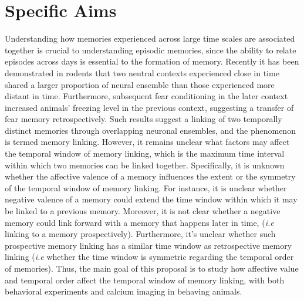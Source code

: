 \documentclass[master.tex]{subfiles}
\begin{document}
\section*{Specific Aims}

Understanding how memories experienced across large time scales are associated
together is crucial to understanding episodic memories, since the ability to
relate episodes across days is essential to the formation of memory. Recently it
has been demonstrated in rodents that two neutral contexts experienced close in
time shared a larger proportion of neural ensemble than those experienced more
distant in time. Furthermore, subsequent fear conditioning in the later context
increased animals' freezing level in the previous context, suggesting a transfer
of fear memory retrospectively. Such results suggest a
linking of two temporally distinct memories through overlapping neuronal
ensembles, and the phenomenon is termed memory linking. However, it remains
unclear what factors may affect the temporal window of memory linking, which is
the maximum time interval within which two memories can be linked together.
Specifically, it is unknown whether the affective valence of a memory influences
the extent or the symmetry of the temporal window of memory linking. For
instance, it is unclear whether negative valence of a memory could extend the
time window within which it may be linked to a previous memory. Moreover, it is
not clear whether a negative memory could link forward with a memory that
happens later in time, (\textit{i.e} linking to a memory prospectively).
Furthermore, it's unclear whether such prospective memory linking has a similar
time window as retrospective memory linking (\textit{i.e} whether the time
window is symmetric regarding the temporal order of memories). Thus, the main
goal of this proposal is to study how affective value and temporal order affect
the temporal window of memory linking, with both behavioral experiments and
calcium imaging in behaving animals.
\end{document}
